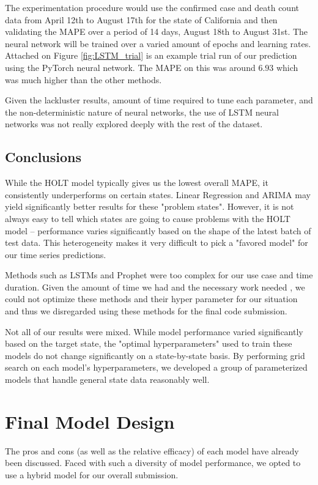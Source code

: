 \documentclass[sigconf,nonacm]{acmart}
\begin{document}
The experimentation procedure would use the confirmed case and death count data
from April 12th to August 17th for the state of California and then validating
the MAPE over a period of 14 days, August 18th to August 31st. The neural
network will be trained over a varied amount of epochs and learning rates. 
Attached on Figure  \ref{fig:LSTM_trial} is an example trial run of our
prediction using the PyTorch neural network. The MAPE on this was around $6.93$
which was much higher than the other methods.

Given the lackluster results, amount of time required to tune each parameter,
and the non-deterministic nature of neural networks, the use of LSTM neural
networks was not really explored deeply with the rest of the dataset.

\subsection{Conclusions}

While the HOLT model typically gives us the lowest overall MAPE, it
consistently underperforms on certain states. Linear Regression and ARIMA may
yield significantly better results for these "problem states". However, it is
not always easy to tell which states are going to cause problems with the HOLT
model -- performance varies significantly based on the shape of the latest
batch of test data. This heterogeneity makes it very difficult to pick a
"favored model" for our time series predictions. 

Methods such as LSTMs and Prophet were too complex for our use case and
time duration. Given the amount of time we had and the necessary work needed 
, we could not optimize these methods and their hyper parameter for our
situation and thus we disregarded using these methods for the final code
submission.

Not all of our results were mixed. While model performance varied significantly
based on the target state, the "optimal hyperparameters" used to train these
models do not change significantly on a state-by-state basis. By performing
grid search on each model's hyperparameters, we developed a group of
parameterized models that handle general state data reasonably well. 


\section{Final Model Design}

The pros and cons (as well as the relative efficacy) of each model have already
been discussed. Faced with such a diversity of model performance, we opted to
use a hybrid model for our overall submission. 
\end{document}
